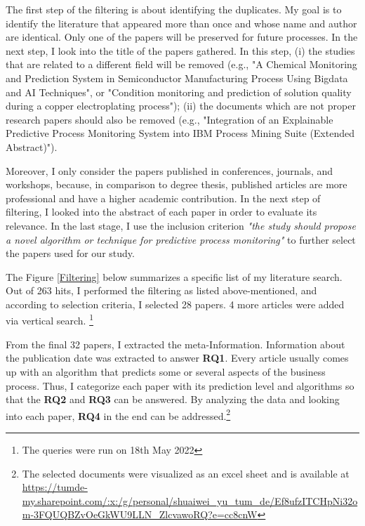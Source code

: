 \documentclass[runningheads]{llncs}
\begin{document}
		The first step of the filtering is about identifying the duplicates. My goal is to identify the literature that appeared more than once and whose name and author are identical. Only one of the papers will be preserved for future processes. In the next step, I look into the title of the papers gathered. In this step, (i) the studies that are related to a different field will be removed (e.g., "A Chemical Monitoring and Prediction System in Semiconductor Manufacturing Process Using Bigdata and AI Techniques", or "Condition monitoring and prediction of solution quality during a copper electroplating process"); (ii) the documents which are not proper research papers should also be removed (e.g., "Integration of an Explainable Predictive Process Monitoring System into IBM Process Mining Suite (Extended Abstract)").
				
		Moreover, I only consider the papers published in conferences, journals, and workshops, because, in comparison to degree thesis, published articles are more professional and have a higher academic contribution. In the next step of filtering, I looked into the abstract of each paper in order to evaluate its relevance. In the last stage, I use the inclusion criterion \textit{"the study should propose a novel algorithm or technique for predictive process monitoring"} to further select the papers used for our study.
		
		The Figure \ref{Filtering} below  summarizes a specific list of my literature search. Out of 263 hits, I performed the filtering as listed above-mentioned, and according to selection criteria, I selected 28 papers. 4 more articles were added via vertical search. \footnote{The queries were run on 18th May 2022}
		
		From the final 32 papers, I extracted the meta-Information. Information about the publication date was extracted to answer \textbf{RQ1}. Every article usually comes up with an algorithm that predicts some or several aspects of the business process. Thus, I categorize each paper with its prediction level and algorithms so that the \textbf{RQ2} and \textbf{RQ3} can be answered. By analyzing the data and looking into each paper, \textbf{RQ4} in the end can be addressed.\footnote{The selected documents were visualized as an excel sheet and is available at \url{https://tumde-my.sharepoint.com/:x:/g/personal/shuaiwei_yu_tum_de/Ef8ufzITCHpNi32om-3FQUQBZvOeGkWU9LLN_ZlcvawoRQ?e=cc8cnW} }
		
\end{document}
